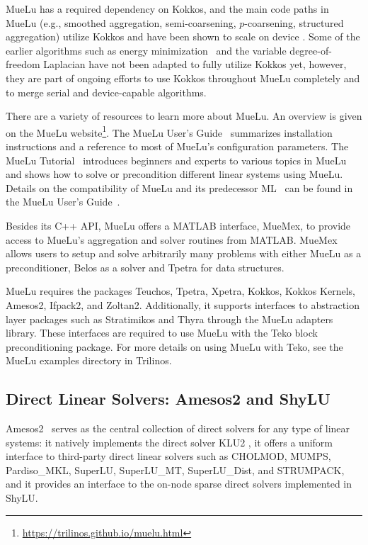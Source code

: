 MueLu has a required dependency on Kokkos,
and the main code paths in MueLu (e.g., smoothed aggregation, semi-coarsening, $p$-coarsening, structured aggregation)
utilize Kokkos and have been shown to scale on device \cite{BettencourtBrownEtAl2021_EmpirePic}.
Some of the earlier algorithms such as energy minimization~\cite{Sala2008a} and the variable degree-of-freedom Laplacian have not been adapted to fully utilize Kokkos yet,
however, they are part of ongoing efforts to use Kokkos throughout MueLu completely and to merge serial and device-capable algorithms.

There are a variety of resources to learn more about MueLu.
An overview is given on the MueLu website\footnote{\url{https://trilinos.github.io/muelu.html}}.
The MueLu User's Guide~\cite{BergerVergiat2023a} summarizes installation instructions and a reference to most of MueLu's configuration parameters.
The MueLu Tutorial~\cite{Mayr2023b} introduces beginners and experts to various topics in MueLu and shows how to solve or precondition different linear systems using MueLu.
Details on the compatibility of MueLu and its predecessor ML~\cite{Heroux2005a,Gee2006a} can be found in the MueLu User's Guide~\cite{BergerVergiat2023a}.

Besides its C++ API, MueLu offers a MATLAB interface, MueMex, to provide access to MueLu's aggregation and solver routines from MATLAB.
MueMex allows users to setup and solve arbitrarily many problems with either MueLu as a preconditioner, Belos as a solver and Tpetra for data structures.

MueLu requires the packages Teuchos, Tpetra, Xpetra, Kokkos, Kokkos Kernels, Amesos2, Ifpack2, and Zoltan2. Additionally, it supports interfaces to abstraction layer packages such as Stratimikos and Thyra through the MueLu adapters library. These interfaces are required to use MueLu with the Teko block preconditioning package. For more details on using MueLu with Teko, see the MueLu examples directory in Trilinos.

\subsection{Direct Linear Solvers: Amesos2 and ShyLU}

Amesos2~\cite{Bavier2012a} serves as the central collection of direct solvers for any type of linear systems:
it natively implements the direct solver KLU2 \cite{Davis2010a},
it offers a uniform interface to third-party direct linear solvers such as CHOLMOD, MUMPS, Pardiso\_MKL, SuperLU, SuperLU\_MT, SuperLU\_Dist, and STRUMPACK,
and it provides an interface to the on-node sparse direct solvers implemented in ShyLU.

